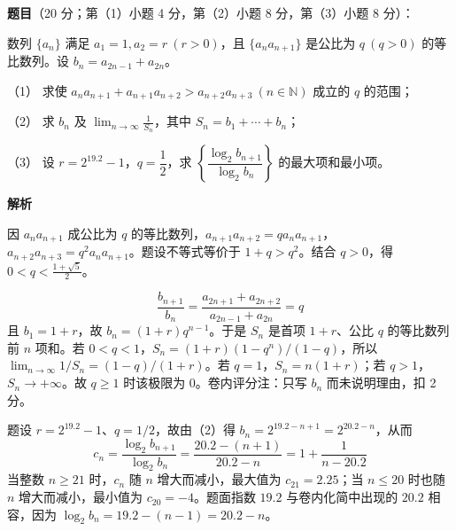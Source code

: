 \begin{answer}

\textbf{题目}（20 分；第（1）小题 4 分，第（2）小题 8 分，第（3）小题 8 分）：

数列 \(\{a_n\}\) 满足 \(a_1=1,a_2=r\ (r>0)\)，且 \(\{a_na_{n+1}\}\) 是公比为 \(q\ (q>0)\) 的等比数列。设 \(b_n=a_{2n-1}+a_{2n}\)。

（1） 求使 \(a_na_{n+1}+a_{n+1}a_{n+2}>a_{n+2}a_{n+3}\ (n\in\mathbb N)\) 成立的 \(q\) 的范围；

（2） 求 \(b_n\) 及 \(\displaystyle\lim_{n\to\infty}\frac1{S_n}\)，其中 \(S_n=b_1+\cdots+b_n\)；

（3） 设 \(r=2^{19.2}-1\)，\(q=\dfrac12\)，求 \(\left\{\dfrac{\log_2b_{n+1}}{\log_2b_n}\right\}\) 的最大项和最小项。

\textbf{解析}


因 \(a_na_{n+1}\) 成公比为 \(q\) 的等比数列，\(a_{n+1}a_{n+2}=q a_na_{n+1}\)，\(a_{n+2}a_{n+3}=q^2a_na_{n+1}\)。题设不等式等价于 \(1+q>q^2\)。结合 \(q>0\)，得 \(0<q<\frac{1+\sqrt5}{2}\)。


\nopagebreak[4]
\[
\frac{b_{n+1}}{b_n}=\frac{a_{2n+1}+a_{2n+2}}{a_{2n-1}+a_{2n}}=q
\]
且 \(b_1=1+r\)，故 \(b_n=(1+r)q^{n-1}\)。于是 \(S_n\) 是首项 \(1+r\)、公比 \(q\) 的等比数列前 \(n\) 项和。若 \(0<q<1\)，\(S_n=(1+r)(1-q^n)/(1-q)\)，所以 \(\lim_{n\to\infty}1/S_n=(1-q)/(1+r)\)。若 \(q=1\)，\(S_n=n(1+r)\)；若 \(q>1\)，\(S_n\to+\infty\)。故 \(q\ge1\) 时该极限为 0。卷内评分注：只写 \(b_n\) 而未说明理由，扣 2 分。


题设 \(r=2^{19.2}-1\)、\(q=1/2\)，故由（2）得 \(b_n=2^{19.2-n+1}=2^{20.2-n}\)，从而
\nopagebreak[4]
\[
c_n=\frac{\log_2b_{n+1}}{\log_2b_n}=\frac{20.2-(n+1)}{20.2-n}=1+\frac1{n-20.2}
\]
当整数 \(n\ge21\) 时，\(c_n\) 随 \(n\) 增大而减小，最大值为 \(c_{21}=2.25\)；当 \(n\le20\) 时也随 \(n\) 增大而减小，最小值为 \(c_{20}=-4\)。题面指数 \(19.2\) 与卷内化简中出现的 \(20.2\) 相容，因为 \(\log_2b_n=19.2-(n-1)=20.2-n\)。




\end{answer}